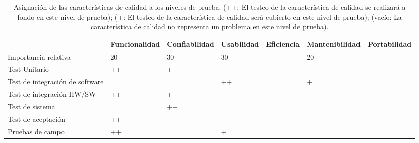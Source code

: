 \documentclass[12pt,a4paper, twosite]{article}
\begin{document}
\begin{table}[htbp]
    \centering

    \begin{adjustwidth}{-1in}{-1in}%
        \begin{tabular}{|l|l|l|l|l|l|l|}\hline \hline
                                            & \bf Funcionalidad  & \bf Confiabilidad & \bf Usabilidad & \bf
            Eficiencia                      & \bf Mantenibilidad & \bf Portabilidad                              \\ \hline
            \hline
            Importancia relativa            &          20        &            30     &       30       &     & 20 &
            \\
            Test Unitario                   &           ++       &           ++      &                &     &  & \\
            Test de integración de software &                    &                   &        ++        &     & + &
            \\
            Test de integración HW/SW       &           ++       &          ++       &                &     &  &
            \\
            Test de sistema                 &                    &           ++        &                &     &  & \\
            Test de aceptación              &           ++       &                   &                &     & 
             &
            \\
            Pruebas de campo                &          ++        &                 &        +        &     &  &
            \\ \hline
        \end{tabular}
        \caption{Asignación de las características de calidad a los niveles de prueba. (++: El testeo de la característica de calidad
se realizará a fondo en este nivel de prueba); (+: El testeo de la característica de calidad será cubierto en este nivel de
prueba); (vacío: La característica de calidad no representa un problema en este nivel de prueba).}
    \end{adjustwidth}
    
\end{table}
\end{document}
